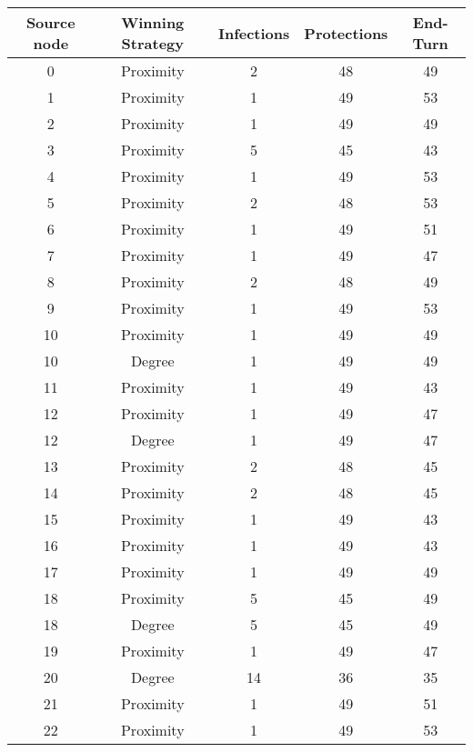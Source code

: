 \documentclass[results.tex]{subfiles}
\begin{document}
\begin{center}
  \begin{tabular}{| c || c | c | c | c |}
    \hline
    {\bfseries Source node} & {\bfseries Winning Strategy} & {\bfseries Infections} & {\bfseries Protections} & {\bfseries End-Turn} \\  %
    \hline\hline
    0 & Proximity & 2 & 48 & 49 \\ 
    \hline
    1 & Proximity & 1 & 49 & 53 \\ 
    \hline
    2 & Proximity & 1 & 49 & 49 \\ 
    \hline
    3 & Proximity & 5 & 45 & 43 \\ 
    \hline
    4 & Proximity & 1 & 49 & 53 \\ 
    \hline
    5 & Proximity & 2 & 48 & 53 \\ 
    \hline
    6 & Proximity & 1 & 49 & 51 \\ 
    \hline
    7 & Proximity & 1 & 49 & 47 \\ 
    \hline
    8 & Proximity & 2 & 48 & 49 \\ 
    \hline
    9 & Proximity & 1 & 49 & 53 \\ 
    \hline
    10 & Proximity & 1 & 49 & 49 \\ 
    \hline
    10 & Degree & 1 & 49 & 49 \\ 
    \hline
    11 & Proximity & 1 & 49 & 43 \\ 
    \hline
    12 & Proximity & 1 & 49 & 47 \\ 
    \hline
    12 & Degree & 1 & 49 & 47 \\ 
    \hline
    13 & Proximity & 2 & 48 & 45 \\ 
    \hline
    14 & Proximity & 2 & 48 & 45 \\ 
    \hline
    15 & Proximity & 1 & 49 & 43 \\ 
    \hline
    16 & Proximity & 1 & 49 & 43 \\ 
    \hline
    17 & Proximity & 1 & 49 & 49 \\ 
    \hline
    18 & Proximity & 5 & 45 & 49 \\ 
    \hline
    18 & Degree & 5 & 45 & 49 \\ 
    \hline
    19 & Proximity & 1 & 49 & 47 \\ 
    \hline
    20 & Degree & 14 & 36 & 35 \\ 
    \hline
    21 & Proximity & 1 & 49 & 51 \\ 
    \hline
    22 & Proximity & 1 & 49 & 53 \\ 

\end{tabular}
\end{center}
\end{document}
